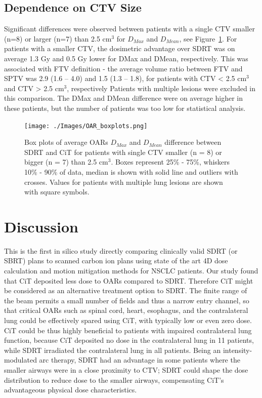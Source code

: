 \documentclass[type=dr, dr=rernat, acm$^3$entcolor=tud7b,colorbacktitle, bigchapter, openright, twoside, 12pt ]{tudthesis}
\begin{document}
\subsection{Dependence on CTV Size}

Significant differences were observed between patients with a single CTV smaller (n=8) or larger (n=7) than 2.5 cm$^3$ for
$D_{Max}$ and $D_{Mean}$, see Figure~\ref{Fig:OAR_boxplots}. For patients with a smaller CTV, the dosimetric advantage over SDRT was on average 1.3 Gy and 0.5 Gy lower for DMax and DMean, respectively. 
This was associated with FTV definition - the average volume ratio between FTV and SPTV was 2.9 (1.6 – 4.0) and 1.5 (1.3 – 1.8), for patients with CTV < 2.5 cm$^3$ and CTV > 2.5 cm$^3$, respectively
Patients with multiple lesions were excluded in this comparison. The DMax and DMean difference were on average higher in these patients, but the number of patients was too low for statistical analysis. 

\begin{figure}[H]
\begin{center}
\texttt{[image: ./Images/OAR\_boxplots.png]}
\caption{Box plots of average OARs $D_{Max}$ and $D_{Mean}$ difference between SDRT and CiT for patients with
single CTV smaller (n = 8) or bigger (n = 7) than 2.5 cm$^3$. Boxes represent 25\% - 75\%, 
whiskers 10\% - 90\% of data, median is shown with solid line and outliers with crosses. 
Values for patients with multiple lung lesions are shown with square symbols.}
\label{Fig:OAR_boxplots}
\end{center}
\end{figure}


\section{Discussion}

This is the first in silico study directly comparing clinically valid SDRT (or SBRT) plans to scanned carbon ion plans using state of the art 4D dose calculation and 
motion mitigation methods for NSCLC patients. Our study found that CiT deposited less dose to OARs compared to SDRT. Therefore CiT might be considered as an alternative 
treatment option to SDRT. The finite range of the beam permits a small number of fields and thus a narrow entry channel, so that critical OARs such as spinal cord, 
heart, esophagus, and the contralateral lung could be effectively spared using CiT, with typically low or even zero dose. CiT could be thus highly beneficial 
to patients with impaired contralateral lung function, because CiT deposited no dose in the contralateral lung in 11 patients, while SDRT irradiated the contralateral
lung in all patients. Being an intensity-modulated arc therapy, SDRT had an advantage in some patients where the smaller airways were in a close proximity to CTV; 
SDRT could shape the dose distribution to reduce dose to the smaller airways, compensating CiT’s advantageous physical dose characteristics.
\end{document}
